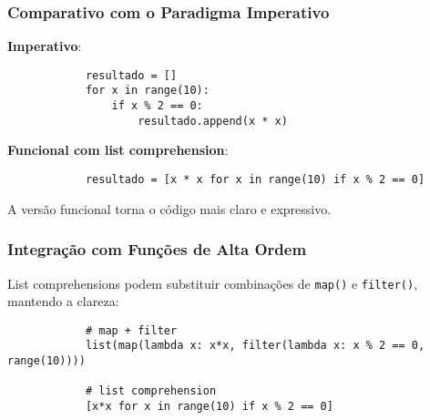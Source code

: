 \documentclass[date,twocolumn,a4paper]{ppgem}
\begin{document}
    \subsubsection{Comparativo com o Paradigma Imperativo}
    \textbf{Imperativo}:

    \begin{listing}[!ht]
        \begin{verbatim}
            resultado = []
            for x in range(10):
                if x % 2 == 0:
                    resultado.append(x * x)
        \end{verbatim}
        \caption{List comprehension - Sequencial/imperativa}
        \label{listing:2}
    \end{listing}
    \textbf{Funcional com list comprehension}:
    \begin{listing}[!ht]
        \begin{verbatim}
            resultado = [x * x for x in range(10) if x % 2 == 0]
        \end{verbatim}
        \caption{List comprehension - Forma funcional}
        \label{listing:2}
    \end{listing}

    A versão funcional torna o código mais claro e expressivo.
    \subsubsection{Integração com Funções de Alta Ordem}
    List comprehensions podem substituir combinações de \texttt{map()} e \texttt{filter()}, mantendo a clareza:

    \begin{listing}[!ht]
        \begin{verbatim}
            # map + filter
            list(map(lambda x: x*x, filter(lambda x: x % 2 == 0, range(10))))

            # list comprehension
            [x*x for x in range(10) if x % 2 == 0]
        \end{verbatim}
        \caption{List comprehension - Comparação com Funções de Alta Ordem\footnote{Veja o capítulo 2.2}}
        \label{listing:2}
    \end{listing}
\end{document}
